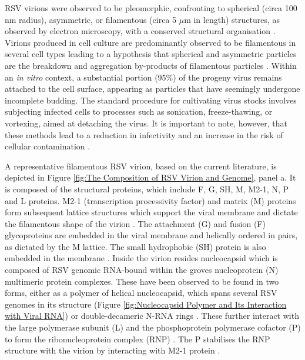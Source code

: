 RSV virions were observed to be pleomorphic, confronting to spherical (circa 100 nm radius), asymmetric, or filamentous (circa 5 \(\mu\)m in length) structures, as observed by electron microscopy, with a conserved structural organisation \cite{Kiss2014StructuralComplex}. Virions produced in cell culture are predominantly observed to be filamentous in several cell types leading to a hypothesis that spherical and asymmetric particles are the breakdown and aggregation by-products of filamentous particles \cite{Ke2018TheTomography, Conley2022HelicalVirus}. Within an \textit{in vitro} context, a substantial portion (95\%) of the progeny virus remains attached to the cell surface, appearing as particles that have seemingly undergone incomplete budding. The standard procedure for cultivating virus stocks involves subjecting infected cells to processes such as sonication, freeze-thawing, or vortexing, aimed at detaching the virus. It is important to note, however, that these methods lead to a reduction in infectivity and an increase in the risk of cellular contamination \cite{Collins2013RespiratoryDisease}.

A representative filamentous RSV virion, based on the current literature, is depicted in Figure \ref{fig:The Composition of RSV Virion and Genome}, panel a. It is composed of the structural proteins, which include F, G, SH, M, M2-1, N, P and L proteins. M2-1 (transcription processivity factor) and matrix (M) proteins form subsequent lattice structures which support the viral membrane and dictate the filamentous shape of the virion \cite{Conley2022HelicalVirus}. The attachment (G) and fusion (F) glycoproteins are embedded in the viral membrane and helically ordered in pairs, as dictated by the M lattice. The small hydrophobic (SH) protein is also embedded in the membrane \cite{Ke2018TheTomography, Conley2022HelicalVirus}. Inside the virion resides nucleocapsid which is composed of RSV genomic RNA-bound within the groves nucleoprotein (N) multimeric protein complexes. These have been observed to be found in two forms, either as a polymer of helical nucleocapsid, which spans several RSV genomes in its structure (Figure \ref{fig:Nucleocapsid Polymer and Its Interaction with Viral RNA}) \cite{Tawar2009CrystalVirus, Conley2022HelicalVirus} or double-decameric N-RNA rings \cite{Gonnin2023StructuralNucleocapsids, Gonnin2022ImportanceVirus, Conley2022HelicalVirus}. These further interact with the large polymerase subunit (L) and the phosphoprotein polymerase cofactor (P) to form the ribonucleoprotein complex (RNP) \cite{Gonnin2023StructuralNucleocapsids}. The P stabilises the RNP structure with the virion by interacting with M2-1 protein \cite{Mason2003InteractionActivity}.

